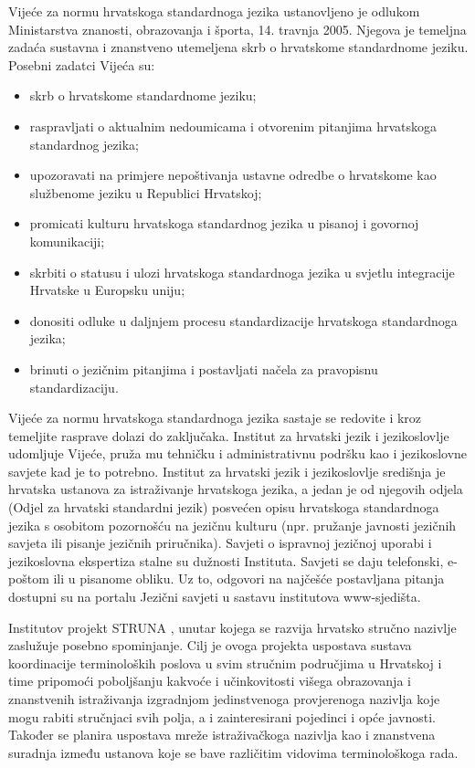 \begin{multicols}{2}
Vijeće za normu hrvatskoga standardnoga jezika ustanovljeno je odlukom Ministarstva znanosti, obrazovanja i športa, 14. travnja 2005. Njegova je temeljna zadaća sustavna i znanstveno utemeljena skrb o hrvatskome standardnome jeziku. Posebni zadatci Vijeća su:

\begin{itemize}
\item skrb o hrvatskome standardnome jeziku;
\item raspravljati o aktualnim nedoumicama i otvorenim pitanjima hrvatskoga standardnog jezika;
\item upozoravati na primjere nepoštivanja ustavne odredbe o hrvatskome kao službenome jeziku u Republici Hrvatskoj;
\item promicati kulturu hrvatskoga standardnog jezika u pisanoj i govornoj komunikaciji;
\item skrbiti o statusu i ulozi hrvatskoga standardnoga jezika u svjetlu integracije Hrvatske u Europsku uniju;
\item donositi odluke u daljnjem procesu standardizacije hrvatskoga standardnoga jezika;
\item brinuti o jezičnim pitanjima i postavljati načela za pravopisnu standardizaciju.
\end{itemize}

Vijeće za normu hrvatskoga standardnoga jezika sastaje se redovite i kroz temeljite rasprave dolazi do zaključaka. Institut za hrvatski jezik i jezikoslovlje udomljuje Vijeće, pruža mu tehničku i administrativnu podršku kao i jezikoslovne savjete kad je to potrebno.
Institut za hrvatski jezik i jezikoslovlje \cite{str7} središnja je hrvatska ustanova za istraživanje hrvatskoga jezika, a jedan je od njegovih odjela (Odjel za hrvatski standardni jezik) posvećen opisu hrvatskoga standardnoga jezika s osobitom pozornošću na jezičnu kulturu (npr. pružanje javnosti jezičnih savjeta ili pisanje jezičnih priručnika). Savjeti o ispravnoj jezičnoj uporabi i jezikoslovna ekspertiza stalne su dužnosti Instituta. Savjeti se daju telefonski, e-poštom ili u pisanome obliku. Uz to, odgovori na najčešće postavljana pitanja dostupni su na portalu Jezični savjeti \cite{str8} u sastavu institutova www-sjedišta.


Institutov projekt STRUNA \cite{str9}, unutar kojega se razvija hrvatsko stručno nazivlje zaslužuje posebno spominjanje. Cilj je ovoga projekta uspostava sustava koordinacije terminoloških poslova u svim stručnim područjima u Hrvatskoj i time pripomoći poboljšanju kakvoće i učinkovitosti višega obrazovanja i znanstvenih istraživanja izgradnjom jedinstvenoga provjerenoga nazivlja koje mogu rabiti stručnjaci svih polja, a i zainteresirani pojedinci i opće javnosti. Također se planira uspostava mreže istraživačkoga nazivlja kao i znanstvena suradnja između ustanova koje se bave različitim vidovima terminološkoga rada.


\end{multicols}
